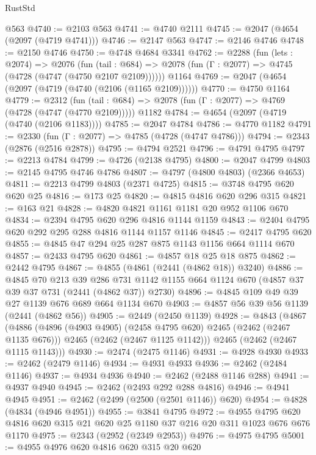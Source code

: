\begin{lexlean}{RustStd}
\begin{coremodule}
    @563
@4740 := @2103 @563
@4741 := @4740 @2111
@4745 := @2047 (@4654 (@2097 (@4719 @4741)))
@4746 := @2147 @563
@4747 := @2146 @4746
@4748 := @2150 @4746
@4750 := @4748 @4684 @3341
@4762 := @2288
    (fun (lets : @2074) =>
    @2076
      (fun (tail : @684) => @2078 (fun (Γ : @2077) => @4745 (@4728 (@4747 (@4750 @2107 @2109))))))
    @1164
@4769 := @2047 (@4654 (@2097 (@4719 (@4740 (@2106 (@1165 @2109))))))
@4770 := @4750 @1164
@4779 := @2312
    (fun (tail : @684) => @2078 (fun (Γ : @2077) => @4769 (@4728 (@4747 (@4770 @2109)))))
    @1182
@4784 := @4654 (@2097 (@4719 (@4740 (@2106 @1183))))
@4785 := @2047 @4784
@4786 := @4770 @1182
@4791 := @2330 (fun (Γ : @2077) => @4785 (@4728 (@4747 @4786)))
@4794 := @2343 (@2876 (@2516 @2878))
@4795 := @4794 @2521
@4796 := @4791 @4795
@4797 := @2213 @4784
@4799 := @4726 (@2138 @4795)
@4800 := @2047 @4799
@4803 := @2145 @4795 @4746 @4786
@4807 := @4797 (@4800 @4803) (@2366 @4653)
@4811 := @2213 @4799 @4803 (@2371 @4725)
@4815 := @3748 @4795 @620 @620 @25
@4816 := @173 @25
@4820 := @4815 @4816 @620 @296 @315
@4821 := @163 @21
@4828 := @4820 @4821 @1161 @1181 @20 @952 @1106 @670
@4834 := @2394 @4795 @620 @296 @4816 @1144 @1159
@4843 := @2404 @4795 @620 @292 @295 @288 @4816 @1144 @1157 @1146
@4845 := @2417 @4795 @620
@4855 := @4845 @47 @294 @25 @287 @875 @1143 @1156 @664 @1114 @670
@4857 := @2433 @4795 @620
@4861 := @4857 @18 @25 @18 @875
@4862 := @2442 @4795
@4867 := @4855 (@4861 (@2441 (@4862 @18)) @3240)
@4886 := @4845
    @70
    @213
    @39
    @286
    @731
    @1142
    @1155
    @664
    @1124
    @670
    (@4857 @37 @39 @37 @731 (@2441 (@4862 @37)) @2730)
@4896 := @4845 @109 @49 @39 @27 @1139 @676 @689 @664 @1134 @670
@4903 := @4857 @56 @39 @56 @1139 (@2441 (@4862 @56))
@4905 := @2449 (@2450 @1139)
@4928 := @4843
    (@4867
      (@4886
        (@4896 (@4903 @4905) (@2458 @4795 @620) @2465 (@2462 (@2467 @1135 @676)))
        @2465
        (@2462 (@2467 @1125 @1142)))
      @2465
      (@2462 (@2467 @1115 @1143)))
@4930 := @2474 (@2475 @1146)
@4931 := @4928 @4930
@4933 := @2462 (@2479 @1146)
@4934 := @4931 @4933
@4936 := @2462 (@2484 @1146)
@4937 := @4934 @4936
@4940 := @2462 (@2488 @1146 @288)
@4941 := @4937 @4940
@4945 := @2462 (@2493 @292 @288 @4816)
@4946 := @4941 @4945
@4951 := @2462 (@2499 (@2500 (@2501 @1146)) @620)
@4954 := @4828 (@4834 (@4946 @4951))
@4955 := @3841 @4795
@4972 := @4955 @4795 @620 @4816 @620 @315 @21 @620 @25 @1180 @37 @216 @20 @311 @1023 @676 @676 @1170
@4975 := @2343 (@2952 (@2349 @2953))
@4976 := @4975 @4795
@5001 := @4955
    @4976
    @620
    @4816
    @620
    @315
    @20
    @620

\end{coremodule}
\end{lexlean}
